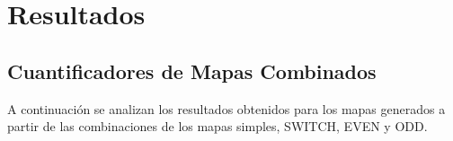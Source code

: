 \section{Resultados}
\label{secResultadosSwitchign}




 

\subsection{Cuantificadores de Mapas Combinados}\label{subsec:SecSwitch}
A continuación se analizan los resultados obtenidos para los mapas generados a partir de las combinaciones de los mapas simples, SWITCH, EVEN y ODD.

